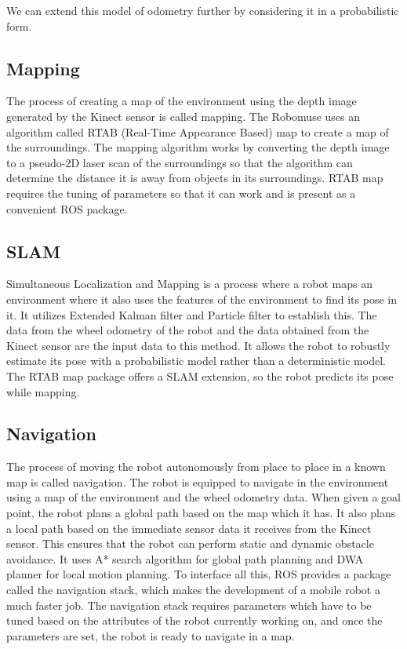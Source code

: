 \documentclass[12pt]{article}
\begin{document}
We can extend this model of odometry further by considering it in a probabilistic form.

\subsection{Mapping}
The process of creating a map of the environment using the depth image generated by the Kinect sensor is called mapping. The Robomuse uses an algorithm called RTAB (Real-Time Appearance Based) map to create a map of the surroundings. The mapping algorithm works by converting the depth image to a pseudo-2D laser scan of the surroundings so that the algorithm can determine the distance it is away from objects in its surroundings. RTAB map requires the tuning of parameters so that it can work and is present as a convenient ROS package.



\subsection{SLAM}
Simultaneous Localization and Mapping is a process where a robot maps an environment where it also uses the features of the environment to find its pose in it. It utilizes Extended Kalman filter and Particle filter to establish this. The data from the wheel odometry of the robot and the data obtained from the Kinect sensor are the input data to this method. It allows the robot to robustly estimate its pose with a probabilistic model rather than a deterministic model. The RTAB map package offers a SLAM extension, so the robot predicts its pose while mapping.


\subsection{Navigation}
The process of moving the robot autonomously from place to place in a known map is called navigation. The robot is equipped to navigate in the environment using a map of the environment and the wheel odometry data. When given a goal point, the robot plans a global path based on the map which it has. It also plans a local path based on the immediate sensor data it receives from the Kinect sensor. This ensures that the robot can perform static and dynamic obstacle avoidance. It uses A* search algorithm for global path planning and DWA planner for local motion planning. To interface all this, ROS provides a package called the navigation stack, which makes the development of a mobile robot a much faster job. The navigation stack requires parameters which have to be tuned based on the attributes of the robot currently working on, and once the parameters are set, the robot is ready to navigate in a map.
\end{document}
